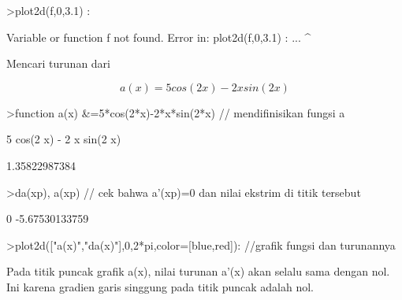 \documentclass[a4paper,10pt]{article}
\begin{document}
\begin{eulernotebook}
\begin{eulercomment}
\begin{eulercomment}
\begin{eulercomment}
\begin{eulercomment}
\begin{eulercomment}
\begin{eulercomment}
\begin{eulercomment}
\begin{eulercomment}
\begin{eulercomment}
\begin{eulercomment}
\begin{eulercomment}
\begin{eulercomment}
\begin{eulercomment}
\begin{eulercomment}
\begin{eulercomment}
\begin{eulercomment}
\begin{eulercomment}
\begin{eulercomment}
\begin{eulercomment}
\begin{eulercomment}
\begin{eulercomment}
\end{eulercomment}
\begin{eulerprompt}
>plot2d(f,0,3.1) :
\end{eulerprompt}
\begin{euleroutput}
  Variable or function f not found.
  Error in:
  plot2d(f,0,3.1) : ...
          ^
\end{euleroutput}
\begin{eulercomment}
Mencari turunan dari\\
\end{eulercomment}
\begin{eulerformula}
\[
a(x)=5cos(2x)-2xsin(2x)
\]
\end{eulerformula}
\begin{eulerprompt}
>function a(x) &=5*cos(2*x)-2*x*sin(2*x) // mendifinisikan fungsi a
\end{eulerprompt}
\begin{euleroutput}
  
                        5 cos(2 x) - 2 x sin(2 x)
  
\end{euleroutput}
\begin{euleroutput}
  1.35822987384
\end{euleroutput}
\begin{eulerprompt}
>da(xp), a(xp) // cek bahwa a'(xp)=0 dan nilai ekstrim di titik tersebut
\end{eulerprompt}
\begin{euleroutput}
  0
  -5.67530133759
\end{euleroutput}
\begin{eulerprompt}
>plot2d(["a(x)","da(x)"],0,2*pi,color=[blue,red]): //grafik fungsi dan turunannya
\end{eulerprompt}
\begin{eulercomment}
Pada titik puncak grafik a(x), nilai turunan a'(x) akan selalu sama
dengan nol. Ini karena gradien garis singgung pada titik puncak adalah
nol.


\end{eulercomment}
\end{eulercomment}
\end{eulercomment}
\end{eulercomment}
\end{eulercomment}
\end{eulercomment}
\end{eulercomment}
\end{eulercomment}
\end{eulercomment}
\end{eulercomment}
\end{eulercomment}
\end{eulercomment}
\end{eulercomment}
\end{eulercomment}
\end{eulercomment}
\end{eulercomment}
\end{eulercomment}
\end{eulercomment}
\end{eulercomment}
\end{eulercomment}
\end{eulercomment}
\end{eulernotebook}
\end{document}
